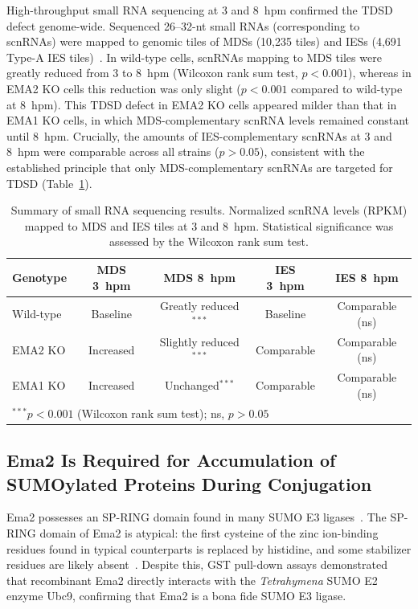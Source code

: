\documentclass[12pt]{article}
\begin{document}
High-throughput small RNA sequencing at 3 and 8~hpm confirmed the TDSD defect genome-wide.
Sequenced 26--32-nt small RNAs (corresponding to scnRNAs) were mapped to genomic tiles of MDSs (10,235 tiles) and IESs (4,691 Type-A IES tiles)~\citep{Schoeberl2012}.
In wild-type cells, scnRNAs mapping to MDS tiles were greatly reduced from 3 to 8~hpm (Wilcoxon rank sum test, $p < 0.001$), whereas in EMA2 KO cells this reduction was only slight ($p < 0.001$ compared to wild-type at 8~hpm).
This TDSD defect in EMA2 KO cells appeared milder than that in EMA1 KO cells, in which MDS-complementary scnRNA levels remained constant until 8~hpm.
Crucially, the amounts of IES-complementary scnRNAs at 3 and 8~hpm were comparable across all strains ($p > 0.05$), consistent with the established principle that only MDS-complementary scnRNAs are targeted for TDSD (Table~\ref{tab:scnRNA}).

\begin{table}[htbp]
\centering
\caption{Summary of small RNA sequencing results. Normalized scnRNA levels (RPKM) mapped to MDS and IES tiles at 3 and 8~hpm. Statistical significance was assessed by the Wilcoxon rank sum test.}
\label{tab:scnRNA}
\begin{tabular}{lcccc}
\toprule
\textbf{Genotype} & \textbf{MDS 3~hpm} & \textbf{MDS 8~hpm} & \textbf{IES 3~hpm} & \textbf{IES 8~hpm} \\
\midrule
Wild-type & Baseline & Greatly reduced$^{***}$ & Baseline & Comparable (ns) \\
EMA2 KO & Increased & Slightly reduced$^{***}$ & Comparable & Comparable (ns) \\
EMA1 KO & Increased & Unchanged$^{***}$ & Comparable & Comparable (ns) \\
\bottomrule
\multicolumn{5}{l}{\footnotesize $^{***}p < 0.001$ (Wilcoxon rank sum test); ns, $p > 0.05$}
\end{tabular}
\end{table}

\subsection{Ema2 Is Required for Accumulation of SUMOylated Proteins During Conjugation}

Ema2 possesses an SP-RING domain found in many SUMO E3 ligases~\citep{Hochstrasser2001}.
The SP-RING domain of Ema2 is atypical: the first cysteine of the zinc ion-binding residues found in typical counterparts is replaced by histidine, and some stabilizer residues are likely absent~\citep{Duan2009, Yunus2009}.
Despite this, GST pull-down assays demonstrated that recombinant Ema2 directly interacts with the \textit{Tetrahymena} SUMO E2 enzyme Ubc9, confirming that Ema2 is a bona fide SUMO E3 ligase.
\end{document}
